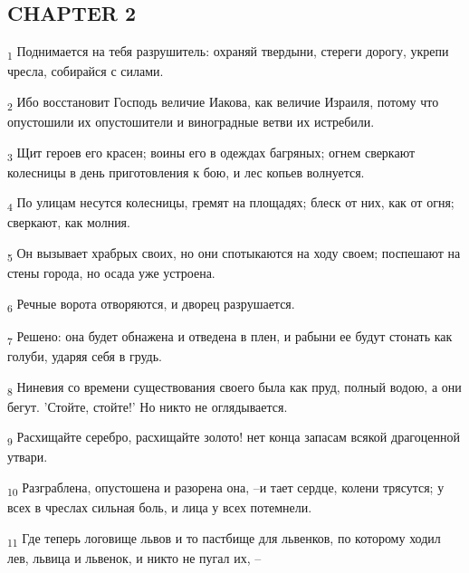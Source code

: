 \subsection{CHAPTER 2}
\begin{tcolorbox}
\textsubscript{1} Поднимается на тебя разрушитель: охраняй твердыни, стереги дорогу, укрепи чресла, собирайся с силами.
\end{tcolorbox}
\begin{tcolorbox}
\textsubscript{2} Ибо восстановит Господь величие Иакова, как величие Израиля, потому что опустошили их опустошители и виноградные ветви их истребили.
\end{tcolorbox}
\begin{tcolorbox}
\textsubscript{3} Щит героев его красен; воины его в одеждах багряных; огнем сверкают колесницы в день приготовления к бою, и лес копьев волнуется.
\end{tcolorbox}
\begin{tcolorbox}
\textsubscript{4} По улицам несутся колесницы, гремят на площадях; блеск от них, как от огня; сверкают, как молния.
\end{tcolorbox}
\begin{tcolorbox}
\textsubscript{5} Он вызывает храбрых своих, но они спотыкаются на ходу своем; поспешают на стены города, но осада уже устроена.
\end{tcolorbox}
\begin{tcolorbox}
\textsubscript{6} Речные ворота отворяются, и дворец разрушается.
\end{tcolorbox}
\begin{tcolorbox}
\textsubscript{7} Решено: она будет обнажена и отведена в плен, и рабыни ее будут стонать как голуби, ударяя себя в грудь.
\end{tcolorbox}
\begin{tcolorbox}
\textsubscript{8} Ниневия со времени существования своего была как пруд, полный водою, а они бегут. 'Стойте, стойте!' Но никто не оглядывается.
\end{tcolorbox}
\begin{tcolorbox}
\textsubscript{9} Расхищайте серебро, расхищайте золото! нет конца запасам всякой драгоценной утвари.
\end{tcolorbox}
\begin{tcolorbox}
\textsubscript{10} Разграблена, опустошена и разорена она, --и тает сердце, колени трясутся; у всех в чреслах сильная боль, и лица у всех потемнели.
\end{tcolorbox}
\begin{tcolorbox}
\textsubscript{11} Где теперь логовище львов и то пастбище для львенков, по которому ходил лев, львица и львенок, и никто не пугал их, --
\end{tcolorbox}
